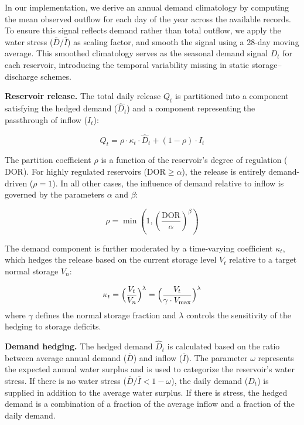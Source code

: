 \documentclass[hess, manuscript]{copernicus}
\begin{document}
In our implementation, we derive an annual demand climatology by computing the mean observed outflow for each day of the year across the available records. To ensure this signal reflects demand rather than total outflow, we apply the water stress ($\bar{D} / \bar{I}$) as scaling factor, and smooth the signal using a 28-day moving average. This smoothed climatology serves as the seasonal demand signal $D_t$ for each reservoir, introducing the temporal variability missing in static storage–discharge schemes.

\medskip
\textbf{Reservoir release.} The total daily release $Q_t$ is partitioned into a component satisfying the hedged demand ($\hat{D}_t$) and a component representing the passthrough of inflow ($I_t$):

\begin{equation}
\label{eq:mhm}
    Q_t = \rho \cdot \kappa_t \cdot \hat{D}_t + (1 - \rho) \cdot I_t
\end{equation}

The partition coefficient $\rho$ is a function of the reservoir's degree of regulation ($\text{DOR}$). For highly regulated reservoirs ($\text{DOR} \geq \alpha$), the release is entirely demand-driven ($\rho = 1$). In all other cases, the influence of demand relative to inflow is governed by the parameters $\alpha$ and $\beta$:

\begin{equation}
\label{eq:partition_coeff}
    \rho = \min\left(1, \left( \frac{\text{DOR}}{\alpha} \right)^\beta \right)
\end{equation}

The demand component is further moderated by a time-varying coefficient $\kappa_t$, which hedges the release based on the current storage level $V_t$ relative to a target normal storage $V_n$:

\begin{equation}
\label{eq:mhm_kappa}
    \kappa_t = \Bigl( \frac{V_t}{V_n} \Bigr)^\lambda = \Bigl( \frac{V_t}{\gamma \cdot V_{\max}} \Bigr)^\lambda
\end{equation}
where $\gamma$ defines the normal storage fraction and $\lambda$ controls the sensitivity of the hedging to storage deficits.

\medskip
\textbf{Demand hedging.} The hedged demand $\hat{D}_t$ is calculated based on the ratio between average annual demand ($\overline{D}$) and inflow ($\overline{I}$). The parameter $\omega$ represents the expected annual water surplus and is used to categorize the reservoir's water stress. If there is no water stress ($\overline{D}/\overline{I} < 1 - \omega$), the daily demand ($D_t$) is supplied in addition to the average water surplus. If there is stress, the hedged demand is a combination of a fraction of the average inflow and a fraction of the daily demand.
\end{document}

